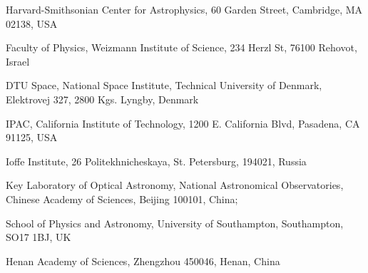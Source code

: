 \documentclass{nature_plusfigure}
\begin{document}
\begin{small}
\begin{affiliations}
\item Harvard-Smithsonian Center for Astrophysics, 60 Garden Street, Cambridge, MA 02138, USA
\item Faculty of Physics, Weizmann Institute of Science, 234 Herzl St, 76100 Rehovot, Israel
\item DTU Space, National Space Institute, Technical University of Denmark, Elektrovej 327, 2800 Kgs. Lyngby, Denmark
\item IPAC, California Institute of Technology, 1200 E. California Blvd, Pasadena, CA 91125, USA
\item Ioffe Institute, 26 Politekhnicheskaya, St. Petersburg, 194021, Russia
\item Key Laboratory of Optical Astronomy, National Astronomical Observatories, Chinese Academy of Sciences, Beĳing 100101, China; 
\item School of Physics and Astronomy, University of Southampton, Southampton, SO17 1BJ, UK
\item Henan Academy of Sciences, Zhengzhou 450046, Henan, China

\end{affiliations}
\end{small}
\end{document}
